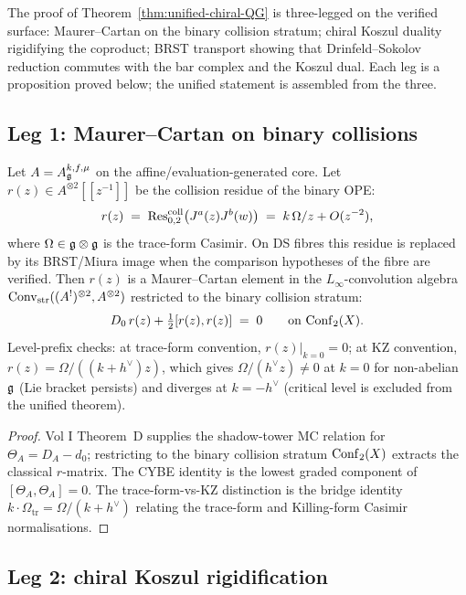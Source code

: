 The proof of Theorem~\ref{thm:unified-chiral-QG} is three-legged on
the verified surface:
Maurer--Cartan on the binary collision stratum; chiral Koszul duality
rigidifying the coproduct; BRST transport showing that
Drinfeld--Sokolov reduction commutes with the bar complex and the
Koszul dual. Each leg is a proposition proved below; the unified
statement is assembled from the three.

\subsection{Leg 1: Maurer--Cartan on binary collisions}
\label{subsec:leg-1-MC}

\begin{proposition}
\label{thm:r-matrix-from-MC}
Let $A = A_{\mathfrak{g}}^{k,f,\mu}$ on the affine/evaluation-generated core.
Let $r(z) \in A^{\otimes 2}[\![z^{-1}]\!]$ be the collision residue of
the binary OPE:
\[
 r(z) \;=\; \operatorname{Res}^{\mathrm{coll}}_{0,2}\bigl(J^a(z)J^b(w)\bigr)
 \;=\; k\,\Omega/z + O(z^{-2}),
\]
where $\Omega\in \mathfrak{g}\otimes\mathfrak{g}$ is the trace-form Casimir. On DS
fibres this residue is replaced by its BRST/Miura image when the
comparison hypotheses of the fibre are verified. Then $r(z)$ is a
Maurer--Cartan element in the
$L_{\infty}$-convolution algebra
$\operatorname{Conv}_{\mathrm{str}}((A^{!})^{\otimes 2}, A^{\otimes 2})$ restricted to the binary
collision stratum:
\[
 D_{0}\,r(z) + \tfrac{1}{2}[r(z), r(z)] \;=\; 0
 \qquad
 \text{on }\mathrm{Conf}_2(X).
\]
Level-prefix checks: at trace-form convention,
$r(z)|_{k=0} = 0$; at KZ convention, $r(z) = \Omega/((k+h^{\vee})z)$,
which gives
$\Omega/(h^{\vee} z)\neq 0$ at $k=0$ for non-abelian $\mathfrak{g}$ (Lie
bracket persists) and diverges at $k=-h^{\vee}$ (critical level is
excluded from the unified theorem).
\end{proposition}

\begin{proof}
Vol I Theorem~D supplies the shadow-tower MC relation for $\Theta_A =
D_A - d_0$; restricting to the binary collision stratum $\mathrm{Conf}_2(X)$
extracts the classical $r$-matrix. The CYBE identity is the lowest
graded component of $[\Theta_A, \Theta_A] = 0$. The trace-form-vs-KZ
distinction is the bridge identity
$k\cdot \Omega_{\mathrm{tr}} = \Omega/(k+h^{\vee})$ relating the
trace-form and Killing-form Casimir normalisations.
\end{proof}

\subsection{Leg 2: chiral Koszul rigidification}
\label{subsec:leg-2-koszul}

